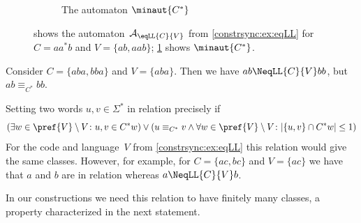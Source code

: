 \begin{example}
\begin{figure}
\begin{subfigure}[b]{0.36\textwidth}
		\caption{The automaton $\minaut{C^*}$}
		\label{fig:ACstar}
	\end{subfigure}
	\caption[Example automaton derived from $\eqLL{C}{V}$]{ shows the automaton~$\mathcal A_{\eqLL{C}{V}}$ 
		from \cref{constrsync:ex:eqLL} for $C = aa^*b$ and $V = \{ab,aab\}$;
		\cref{fig:ACstar} shows $\minaut{C^*}$.}
	\label{fig:eqLLaut}
\end{figure}
\end{example}

\begin{example}
	Consider $C = \{aba,bba\}$ and $V = \{aba\}$.
	Then we have $ab \NeqLL{C}{V} bb$,
	but $ab \equiv_{C^*} bb$.   
\end{example}


\begin{remark} %
Setting two words $u,v \in \Sigma^*$ in relation precisely if
\[
( \exists w \in \pref{V} \setminus V \colon u,v \in C^*w ) \lor
( u \equiv_{C^*} v \land \forall w \in \pref{V} \setminus V \colon |\{u,v\} \cap C^*w| \le 1 )
\]	
For the code 
and language~$V$ from \cref{constrsync:ex:eqLL}  
this relation would give the same classes.
However, for example, 
for $C = \{ ac, bc\}$
and $V = \{ac\}$ we have that $a$ and $b$ are in relation
whereas $a \NeqLL{C}{V} b$.
\end{remark}

In our constructions
we need this relation to have finitely many classes, a property characterized
in the next statement.

